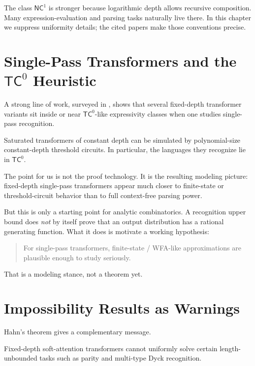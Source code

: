The class $\mathsf{NC}^1$ is stronger because logarithmic depth allows recursive composition. Many expression-evaluation and parsing tasks naturally live there. In this chapter we suppress uniformity details; the cited papers make those conventions precise.

\section{Single-Pass Transformers and the $\mathsf{TC}^0$ Heuristic}

A strong line of work, surveyed in \cite{StroblEtAl2024}, shows that several fixed-depth transformer variants sit inside or near $\mathsf{TC}^0$-like expressivity classes when one studies single-pass recognition.

\begin{theorem}
Saturated transformers of constant depth can be simulated by polynomial-size constant-depth threshold circuits. In particular, the languages they recognize lie in $\mathsf{TC}^0$.
\end{theorem}

The point for us is not the proof technology. It is the resulting modeling picture: fixed-depth single-pass transformers appear much closer to finite-state or threshold-circuit behavior than to full context-free parsing power.

But this is only a starting point for analytic combinatorics. A recognition upper bound does \emph{not} by itself prove that an output distribution has a rational generating function. What it does is motivate a working hypothesis:
\begin{quote}
For single-pass transformers, finite-state / WFA-like approximations are plausible enough to study seriously.
\end{quote}
That is a modeling stance, not a theorem yet.

\section{Impossibility Results as Warnings}

Hahn's theorem gives a complementary message.

\begin{theorem}
Fixed-depth soft-attention transformers cannot uniformly solve certain length-unbounded tasks such as parity and multi-type Dyck recognition.
\end{theorem}

